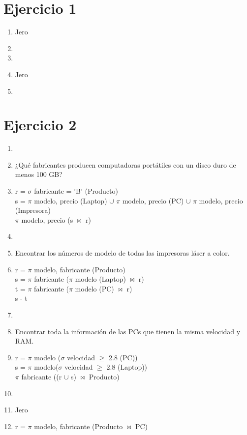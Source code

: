 \documentclass[a4paper, 12pt]{report}
\begin{document}
\section*{Ejercicio 1}{
\begin{enumerate}[label=\alph*)]
\item{Jero}
\item{}
\item{}
\item{Jero}
\item{}
\end{enumerate}
}

\section*{Ejercicio 2}{
\begin{enumerate}[label=\alph*)]
\item{}
\item{¿Qué fabricantes producen computadoras portátiles con un disco duro de
    menos 100 GB?}
\item{r = $\sigma$ fabricante = 'B' (Producto)\\
	s = $\pi$ modelo, precio (Laptop) $\cup$ $\pi$ modelo, precio (PC)
	$\cup$ $\pi$ modelo, precio (Impresora) \\
	$\pi$ modelo, precio (s $\Join$ r)}
\item{}
\item{Encontrar los números de modelo de todas las impresoras láser a color.}
\item{r = $\pi$ modelo, fabricante (Producto)\\
	s = $\pi$ fabricante ($\pi$ modelo (Laptop) $\Join$ r)\\
	t = $\pi$ fabricante ($\pi$ modelo (PC) $\Join$ r)\\
	s - t\\}
\item{}
\item{Encontrar toda la información de las PCs que tienen la misma velocidad y
    RAM.}
\item{r = $\pi$ modelo ($\sigma$ velocidad $\geq$ 2.8 (PC))\\
s = $\pi$ modelo($\sigma$ velocidad $\geq$ 2.8 (Laptop))\\
$\pi$ fabricante ((r $\cup$ s) $\Join$ Producto)\\
}
\item{}
\item{Jero}
\item{r = $\pi$ modelo, fabricante (Producto $\Join$ PC)\\
}
\end{enumerate}}
\end{document}

